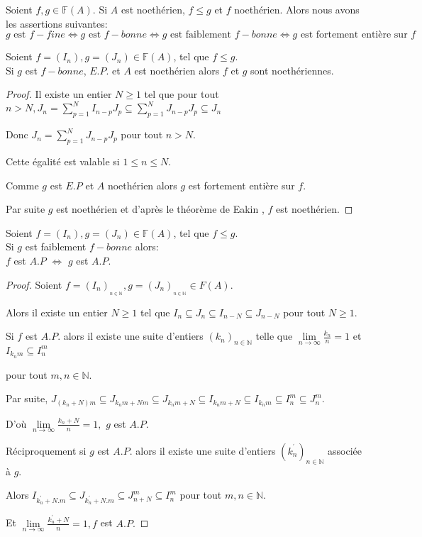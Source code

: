 \begin{moncorollaire}
	\label{maprop9}
	Soient $f,g \in \mathbb{F}(A)$. Si $A$ est noethérien, $f \leqslant g$ et $f$ noethérien. Alors nous avons les assertions suivantes:
	\[ g \text{ est } f-fine \Longleftrightarrow  g \text{ est } f-bonne \Longleftrightarrow  g \text{ est faiblement } f-bonne \Longleftrightarrow  g \text{ est fortement entière sur } f \]
\end{moncorollaire}
\begin{maproposition}
	Soient $f=(I_n), g=(J_n) \in \mathbb{F}(A)$, tel que $f \leqslant g$.\\ Si $g$ est $f-bonne$, $E.P.$ et $A$ est noethérien alors $f$ et $g$ sont noethériennes.
\end{maproposition}
\begin{proof}
	Il existe un entier $N\geq 1$ tel que pour tout $n>N,J_{n}=\sum%
	\limits_{p=1}^{N}I_{n-p}J_{p}\subseteq
	\sum\limits_{p=1}^{N}J_{n-p}J_{p}\subseteq J_{n}$
	
	Donc $J_{n}=\sum\limits_{p=1}^{N}J_{n-p}J_{p}$ pour tout $n>N.$
	
	Cette égalité est valable si $1\leq n\leq N.$
	
	Comme $g$ est $E.P$ et $A$ noethérien alors $g$ est fortement entière sur $f.$ 
	
	Par suite $g$ est noethérien et d'après le théorème de
	Eakin \cite{Eak}, $f$ est noethérien. 
\end{proof}
\begin{maproposition}
	Soient $f=(I_n), g=(J_n) \in \mathbb{F}(A)$, tel que $f \leqslant g$.\\Si $g$ est faiblement $f-bonne$ alors:\\ $f$ est $A.P$ $\Longleftrightarrow$ $g$ est $A.P$.
\end{maproposition}
\begin{proof}
	Soient $f=(I_{n})_{_{n\in \mathbb{N}}},g=(J_{n})_{_{n\in\mathbb{N}}}\in F(A).$
	
	Alors il existe un entier $N\geq 1$ tel que $I_{n}\subseteq J_{n}\subseteq
	I_{n-N}\subseteq J_{n-N}$ pour tout $N\geq 1.$
	
	Si $f$ est $A.P.$ alors il existe une suite d'entiers $(k_{n})_{n\in \mathbb{N}}$ telle que $\underset{n\longrightarrow \infty }{\lim }\frac{k_{n}}{n}=1$
	et $I_{k_{n}m}\subseteq I_{n}^{m}$
	
	pour tout $m,n\in \mathbb{N}.$
	
	Par suite, $J_{(k_{n}+N)m}\subseteq J_{k_{n}m+Nm}\subseteq
	J_{k_{n}m+N}\subseteq I_{k_{n}m+N}\subseteq I_{k_{n}m}\subseteq
	I_{n}^{m}\subseteq J_{n}^{m}.$
	
	D'où $\underset{n\longrightarrow \infty }{\lim }\frac{k_{n}+N}{n%
	}=1,$ $g$ est $A.P.$
	
	Réciproquement si $g$ est $A.P.$ alors il existe une suite d'entiers $(k_{n}^{^{\prime }})_{n\in \mathbb{N}}$ associée à $g.$
	
	Alors $I_{k_{n}^{\prime }+N.m}\subseteq J_{k_{n}^{\prime }+N.m}\subseteq
	J_{n+N}^{m}\subseteq I_{n}^{m}$ pour tout $m,n\in \mathbb{N}.$
	
	Et $\underset{n\longrightarrow \infty }{\lim }\frac{k_{n}^{\prime }+N}{n}=1,f
	$ est $A.P.$
\end{proof}
